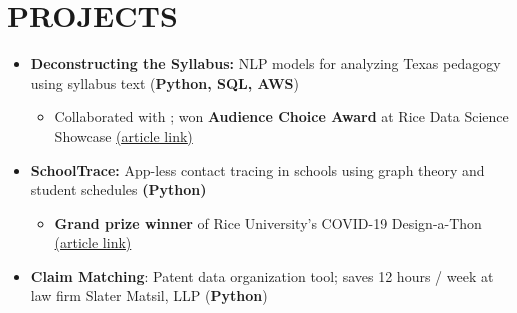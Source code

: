 \documentclass[11pt,a4paper,roman]{moderncv}        %
\begin{document}
\section{PROJECTS}
{\begin{itemize}
    \item \normalsize{\textbf{Deconstructing the Syllabus:}} \small{NLP models for analyzing Texas pedagogy using syllabus text (\textbf{Python, SQL, AWS})}
    \begin{itemize}\item Collaborated with \href{https://openstax.org/}{\underline{}}; won \textbf{Audience Choice Award} at Rice
        Data Science Showcase \href{https://www.youtube.com/watch?v=JsUe3temhcw}{(\underline{article link})}
    \end{itemize}
    \item \normalsize{\textbf{SchoolTrace:}} \small{App-less contact tracing in schools using graph theory and student schedules \textbf{(Python)}}
    \begin{itemize}
        \item \textbf{Grand prize winner} of Rice University's COVID-19 Design-a-Thon \href{http://news.rice.edu/2020/07/21/contact-tracing-software-takes-top-prize-at-rice-design-a-thon/}{(\underline{article link})}
    \end{itemize}
    \item \normalsize{\textbf{Claim Matching}:} \small{Patent data organization tool; saves 12 hours / week at law firm Slater Matsil, LLP (\textbf{Python})}
    
    
\end{itemize}

}
\\
\\
\nocite{*}

\end{document}
